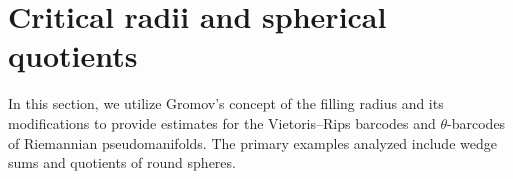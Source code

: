 
\section{Critical radii and spherical quotients}\label{s:barcodes}

In this section, we utilize Gromov's concept of the filling radius and its modifications to provide estimates for the Vietoris--Rips barcodes and \(\theta\)-barcodes of Riemannian pseudomanifolds.
The primary examples analyzed include wedge sums and quotients of round spheres.




